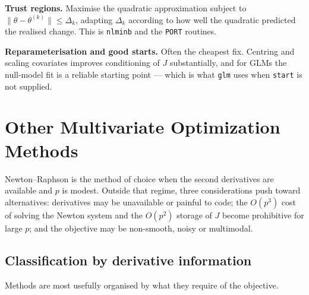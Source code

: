 \documentclass[
  letterpaper,
  DIV=11,
  numbers=noendperiod]{scrreprt}
\begin{document}
\textbf{Trust regions.} Maximise the quadratic approximation subject to
\(\|\theta - \theta^{(k)}\| \le \Delta_k\), adapting \(\Delta_k\)
according to how well the quadratic predicted the realised change. This
is \texttt{nlminb} and the \texttt{PORT} routines.

\textbf{Reparameterisation and good starts.} Often the cheapest fix.
Centring and scaling covariates improves conditioning of \(J\)
substantially, and for GLMs the null-model fit is a reliable starting
point --- which is what \texttt{glm} uses when \texttt{start} is not
supplied.

\section{Other Multivariate Optimization
Methods}\label{other-multivariate-optimization-methods}

Newton--Raphson is the method of choice when the second derivatives are
available and \(p\) is modest. Outside that regime, three considerations
push toward alternatives: derivatives may be unavailable or painful to
code; the \(O(p^3)\) cost of solving the Newton system and the
\(O(p^2)\) storage of \(J\) become prohibitive for large \(p\); and the
objective may be non-smooth, noisy or multimodal.

\subsection{Classification by derivative
information}\label{classification-by-derivative-information}

Methods are most usefully organised by what they require of the
objective.
\end{document}
